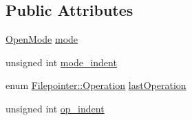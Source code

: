 \subsection*{Public Attributes}
\begin{DoxyCompactItemize}
\item 
\hyperlink{checkio_8cpp_a3a70f8b621474c9885f80fe709e2dca2}{Open\-Mode} \hyperlink{struct_filepointer_a56618b53461d3cc5281f8f2750bf109e}{mode}
\item 
unsigned int \hyperlink{struct_filepointer_af42d237df842da4a07835a7762c0ac93}{mode\-\_\-indent}
\item 
enum \hyperlink{struct_filepointer_a953284a96849bec9523725cc803ca7a5}{Filepointer\-::\-Operation} \hyperlink{struct_filepointer_af2d4dd45b988821f27c727858efda2a5}{last\-Operation}
\item 
unsigned int \hyperlink{struct_filepointer_a50eadd2470a4e7561d0381a11e67c434}{op\-\_\-indent}
\end{DoxyCompactItemize}


